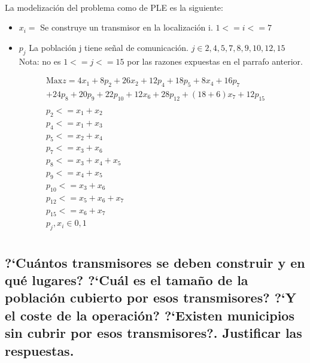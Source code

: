 \documentclass[10pt, a4paper]{article}
\begin{document}
			\paragraph{}
			La modelización del problema como de PLE es la siguiente:

			\begin{itemize}
				\item \(x_{i} = \) Se construye un transmisor en la localización i. $1<= i <= 7$

				\item \(p_{j} \) La población j tiene señal de comunicación. $j \in {2,4,5,7,8,9,10,12,15}$ Nota: no es  $1<= j <= 15$ por las razones expuestas en el parrafo anterior.
			\end{itemize}

			\[
				\begin{split}
					\text{Max} z = 4x_{1} + 8p_{2} + 26x_{2} + 12p_{4} +18p_{5} + 8x_{4} + 16p_{7} \\
						+ 24p_{8} +20p_{9} + 22p_{10}  +  12x_{6} + 28p_{12} + (18+6)x_{7} + 12p_{15} \\ \\
						p_2 <= x_1 + x_2\\
						p_4 <= x_1 + x_3\\
						p_5 <= x_2 + x_4\\
						p_7 <= x_3 + x_6\\
						p_8 <= x_3 + x_4 + x_5\\
						p_9 <= x_4 + x_5\\
						p_{10} <= x_3 + x_6\\
						p_{12} <= x_5 + x_6 + x_7\\
						p_{15} <= x_6 + x_7\\
						p_{j}, x_{i} \in {0,1}\\
				\end{split}
			\]


		\subsection{?`Cuántos transmisores se deben construir y en qué lugares? ?`Cuál es el tamaño de la población cubierto por esos transmisores? ?`Y el coste de la operación? ?`Existen municipios sin cubrir por esos transmisores?. Justificar las respuestas.}

			\paragraph{}
\end{document}
